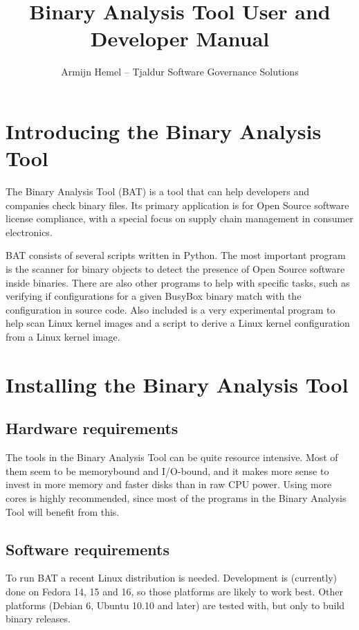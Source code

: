 \documentclass[10pt]{article}
\author{Armijn Hemel -- Tjaldur Software Governance Solutions}
\title{Binary Analysis Tool User and Developer Manual}
\begin{document}
\maketitle
\thispagestyle{empty}

\section{Introducing the Binary Analysis Tool}

The Binary Analysis Tool (BAT) is a tool that can help developers and companies
check binary files. Its primary application is for Open Source software license
compliance, with a special focus on supply chain management in consumer
electronics.

BAT consists of several scripts written in Python. The most important program
is the scanner for binary objects to detect the presence of Open Source
software inside binaries. There are also other programs to help with specific
tasks, such as verifying if configurations for a given BusyBox binary match
with the configuration in source code. Also included is a very experimental
program to help scan Linux kernel images and a script to derive a Linux kernel
configuration from a Linux kernel image.

\section{Installing the Binary Analysis Tool}

\subsection{Hardware requirements}

The tools in the Binary Analysis Tool can be quite resource intensive. Most of
them seem to be memorybound and I/O-bound, and it makes more sense to invest
in more memory and faster disks than in raw CPU power. Using more cores is
highly recommended, since most of the programs in the Binary Analysis Tool will
benefit from this.

\subsection{Software requirements}

To run BAT a recent Linux distribution is needed. Development is (currently)
done on Fedora 14, 15 and 16, so those platforms are likely to work best.
Other platforms (Debian 6, Ubuntu 10.10 and later) are tested with, but only to
build binary releases.
\end{document}
